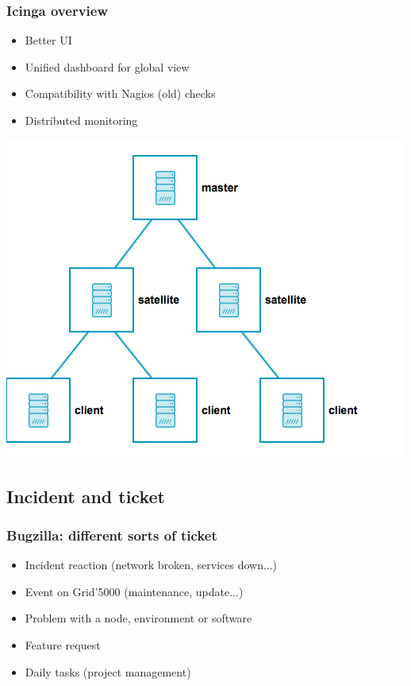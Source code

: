 \documentclass[11pt,compress]{beamer}
\begin{document}
\begin{frame}
\frametitle{Icinga overview}
\begin{itemize}
\item Better UI
\item Unified dashboard for global view
\item Compatibility with Nagios (old) checks
\item Distributed monitoring
\end{itemize}
\begin{center}
\includegraphics[scale=0.3]{figures/icinga2_distributed_roles}
\end{center}
\end{frame}

\subsection{Incident and ticket}
\begin{frame}
\frametitle{Bugzilla: different sorts of ticket}
\begin{itemize}
\item Incident reaction (network broken, services down...)
\item Event on Grid'5000 (maintenance, update...)
\item Problem with a node, environment or software
\item Feature request
\item Daily tasks (project management)
\end{itemize}
\end{frame}
\end{document}
